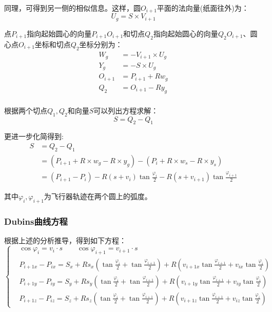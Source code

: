 同理，可得到另一侧的相似信息。这样，圆$O_{i+1}$平面的法向量(纸面往外)为：
\begin{equation}
    U_g = S \times V_{i+1}
\end{equation}

点$P_{i+1}$指向起始圆心的向量$P_{i+1}O_{i+1}$和切点$Q_2$指向起始圆心的向量$Q_2O_{i+1}$、圆心点$O_{i+1}$坐标和切点$Q_2$坐标分别为：
\begin{equation}
\begin{aligned}
W_g & = - V_{i+1} \times U_g \\
Y_g & = - S \times U_g \\
O_{i+1} & = P_{i+1} + R  w_g \\
Q_2 & = O_{i+1} - R  y_g \\
\end{aligned}
\end{equation}

根据两个切点$Q_1,Q_2$和向量$S$可以列出方程求解：
\begin{equation}
   S = Q_2 - Q_1 
\end{equation}

更进一步化简得到:
\begin{equation}
\begin{aligned}
S & = Q_2 - Q_1 \\
  & = \left(P_{i+1}+{R} \times w_{g}-{R} \times y_{g}\right)-\left(P_{i}+{R} \times w_{s}-{R} \times y_{s}\right) \\
  & = \left(P_{i+1}-P_{i}\right)-R\left(s+v_{i}\right) \tan \frac{\varphi_{i}}{2}-R\left(s+v_{i+1}\right) \tan \frac{\varphi_{i+1}}{2}
\end{aligned}
\end{equation}

其中$\varphi_{i},\varphi_{i+1} $为飞行器轨迹在两个圆上的弧度。

\subsubsection{Dubins曲线方程}
根据上述的分析推导，得到如下方程：
\begin{equation}\label{eq:dub-eq}
\left\{
\begin{split}
&   \cos \varphi_{i}=v_{i} \cdot s \qquad \cos \varphi_{i+1}=v_{i+1} \cdot s \\
& P_{i+1 x}-P_{i x} =S_{x}+R s_{x}\left(\tan \frac{\varphi_{i}}{2}+\tan \frac{\varphi_{i+1}}{2}\right)+R\left(v_{i+1 x} \tan \frac{\varphi_{i+1}}{2}+v_{i x} \tan \frac{\varphi_{i}}{2}\right) \\ 
& P_{i+1 y}-P_{i y} =S_{y}+R s_{y}\left(\tan \frac{\varphi_{i}}{2}+\tan \frac{\varphi_{i+1}}{2}\right)+R\left(v_{i+1 y} \tan \frac{\varphi_{i+1}}{2}+v_{i y} \tan \frac{\varphi_{i}}{2}\right) \\ 
& P_{i+1 z}-P_{i z} =S_{z}+R s_{z}\left(\tan \frac{\varphi_{i}}{2}+\tan \frac{\varphi_{i+1}}{2}\right)+R\left(v_{i+1 z} \tan \frac{\varphi_{i+1}}{2}+v_{i z} \tan \frac{\varphi_{i}}{2}\right)
\end{split}
\right.
\end{equation}


